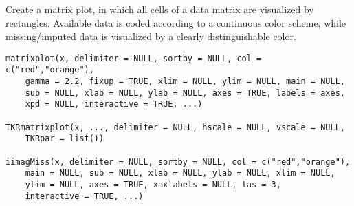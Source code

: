 %
\begin{Description}\relax
Create a matrix plot, in which all cells of a data matrix are visualized by 
rectangles.  Available data is coded according to a continuous color scheme, 
while missing/imputed data is visualized by a clearly distinguishable color.
\end{Description}
%
\begin{Usage}
\begin{verbatim}
matrixplot(x, delimiter = NULL, sortby = NULL, col = c("red","orange"),
    gamma = 2.2, fixup = TRUE, xlim = NULL, ylim = NULL, main = NULL,
    sub = NULL, xlab = NULL, ylab = NULL, axes = TRUE, labels = axes,
    xpd = NULL, interactive = TRUE, ...)

TKRmatrixplot(x, ..., delimiter = NULL, hscale = NULL, vscale = NULL,
    TKRpar = list())

iimagMiss(x, delimiter = NULL, sortby = NULL, col = c("red","orange"),
    main = NULL, sub = NULL, xlab = NULL, ylab = NULL, xlim = NULL,
    ylim = NULL, axes = TRUE, xaxlabels = NULL, las = 3,
    interactive = TRUE, ...)
\end{verbatim}
\end{Usage}
%

